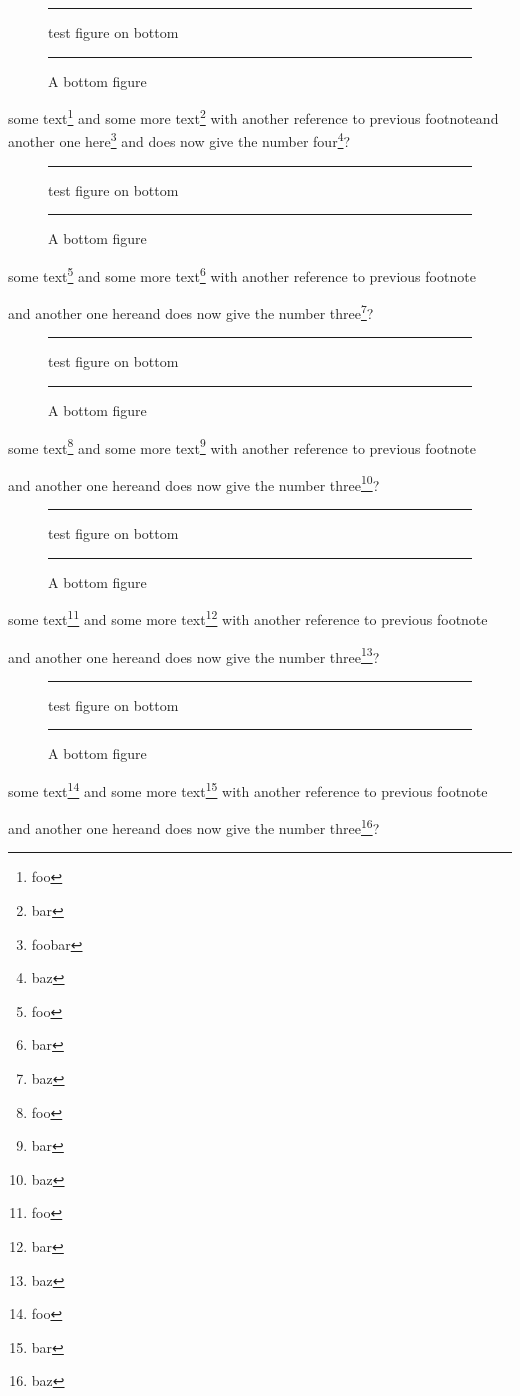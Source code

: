 \documentclass{report}
\newcommand\Afigure{\begin{figure}[b]
\hrule
test figure on bottom
\hrule
\caption{A bottom figure}
\end{figure}}
\begin{document}
\Afigure

\setcounter{footnote}{10}

some text\footnote{foo} and some more text\footnote{bar} with another
reference to previous
footnote\footnotemark[\value{footnote}] 
and another one here\footnote{foobar}
and does now give the number four\footnote{baz}?


\pagebreak




\Afigure

some text\footnote{foo} and some more text\footnote{bar} with another
reference to previous
footnote\addtocounter{footnote}{-1}\footnotemark{}
and another one here
and does now give the number three\footnote{baz}?


\pagebreak


\Afigure

some text\footnote{foo} and some more text\footnote{bar} with another
reference to previous
footnote\addtocounter{footnote}{-1}\footnotemark{}
and another one here
and does now give the number three\footnote{baz}?


\pagebreak


\Afigure

some text\footnote{foo} and some more text\footnote{bar} with another
reference to previous
footnote\addtocounter{footnote}{-1}\footnotemark{}
and another one here
and does now give the number three\footnote{baz}?


\pagebreak

 

\Afigure

some text\footnote{foo} and some more text\footnote{bar} with another
reference to previous
footnote\addtocounter{footnote}{-1}\footnotemark{}
and another one here
and does now give the number three\footnote{baz}?

\clearpage

\end{document}
